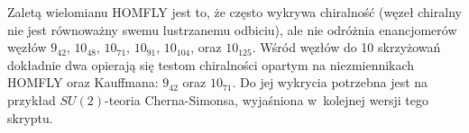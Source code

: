Zaletą wielomianu HOMFLY jest to, że często wykrywa chiralność (węzeł chiralny nie jest równoważny swemu lustrzanemu odbiciu), ale nie odróżnia enancjomerów węzłów $9_{42}$, $10_{48}$, $10_{71}$, $10_{91}$, $10_{104}$, oraz $10_{125}$.
Wśród węzłów do 10 skrzyżowań dokładnie dwa opierają się testom chiralności opartym na niezmiennikach HOMFLY oraz Kauffmana: $9_{42}$ oraz $10_{71}$.
Do jej wykrycia potrzebna jest na przykład $SU(2)$-teoria Cherna-Simonsa, wyjaśniona w~kolejnej wersji tego skryptu.





